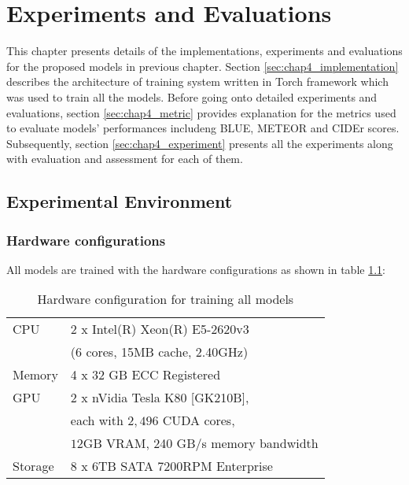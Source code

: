 \chapter{Experiments and Evaluations}

This chapter presents details of the implementations, experiments and evaluations for the proposed models in previous chapter. Section \ref{sec:chap4_implementation} describes the architecture of training system written in Torch framework which was used to train all the models. Before going onto detailed experiments and evaluations, section \ref{sec:chap4_metric} provides explanation for the metrics used to evaluate models' performances includeng BLUE, METEOR and CIDEr scores. Subsequently, section \ref{sec:chap4_experiment} presents all the experiments along with evaluation and assessment for each of them.


\section{Experimental Environment}
\label{sec:chap4_environment}

\subsection{Hardware configurations}
\label{sec:hardware}
All models are trained with the hardware configurations as shown in table \ref{tab:hardware_configuration}:

\begin{table}
	\centering
	\caption{Hardware configuration for training all models}	
	\label{tab:hardware_configuration}
	\begin{tabularx}{0.65\textwidth}{ll}
		\toprule
		CPU & 2 x Intel(R) Xeon(R) E5-2620v3 \\
			& (6 cores, 15MB cache, 2.40GHz) \\
		\midrule
		Memory & 4 x 32 GB ECC Registered \\
		\midrule 
		GPU & 2 x nVidia Tesla K80 [GK210B], \\
			& each with $2,496$ CUDA cores, \\
			& $12$GB VRAM, 240 GB/s memory bandwidth \\
		\midrule
		Storage & 8 x 6TB SATA 7200RPM Enterprise \\
		\bottomrule
	\end{tabularx}
\end{table}



